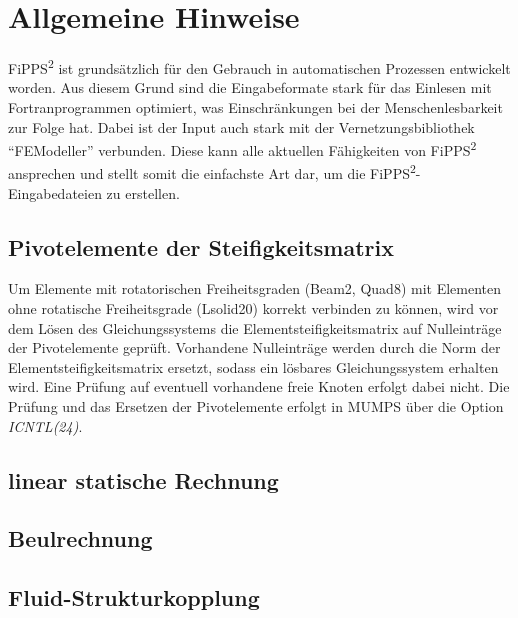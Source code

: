 \documentclass[11pt,titlepage,listof=totoc,bibliography=totoc,twoside]{scrreprt}
\begin{document}

\tableofcontents

\newpage

\setcounter{page}{1}


\chapter{Allgemeine Hinweise}

FiPPS\textsuperscript{2} ist grundsätzlich für den Gebrauch in automatischen Prozessen entwickelt worden. Aus diesem Grund sind die Eingabeformate stark für das Einlesen mit Fortranprogrammen optimiert, was Einschränkungen bei der Menschenlesbarkeit zur Folge hat. Dabei ist der Input auch stark mit der Vernetzungsbibliothek ``FEModeller'' verbunden. Diese kann alle aktuellen Fähigkeiten von FiPPS\textsuperscript{2} ansprechen und stellt somit die einfachste Art dar, um die FiPPS\textsuperscript{2}-Eingabedateien zu erstellen.

\section{Pivotelemente der Steifigkeitsmatrix}

Um Elemente mit rotatorischen Freiheitsgraden (Beam2, Quad8) mit Elementen ohne rotatische Freiheitsgrade (Lsolid20) korrekt verbinden zu können, wird vor dem Lösen des Gleichungssystems die Elementsteifigkeitsmatrix auf Nulleinträge der Pivotelemente geprüft. Vorhandene Nulleinträge werden durch die Norm der Elementsteifigkeitsmatrix ersetzt, sodass ein lösbares Gleichungssystem erhalten wird. Eine Prüfung auf eventuell vorhandene freie Knoten erfolgt dabei nicht. Die Prüfung und das Ersetzen der Pivotelemente erfolgt in MUMPS über die Option \emph{ICNTL(24)}.

\section{linear statische Rechnung}

\section{Beulrechnung}

\section{Fluid-Strukturkopplung}
\label{sec:fluid-strukturkopplung}
\end{document}
